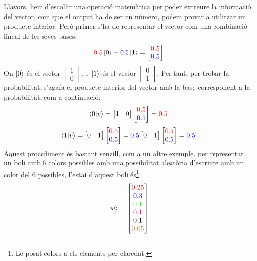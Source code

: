 Llavors, hem d'escollir una operació matemàtica per poder extreure la informació del vector, com que el output ha de ser un número, podem provar a utilitzar un producte interior. Però primer s'ha de representar el vector com una combinació lineal de les seves bases:
$$
\textcolor{red}{0.5}\ket{0} + \textcolor{blue}{0.5}\ket{1} = \begin{bmatrix}
	\textcolor{red}{0.5} \\
	\textcolor{blue}{0.5}
\end{bmatrix}
$$
On $\ket{0}$ és el vector $\begin{bmatrix} 1 \\ 0\end{bmatrix}$, i, $\ket{1}$ és el vector $\begin{bmatrix} 0 \\ 1 \end{bmatrix}$.
Per tant, per trobar la probabilitat, s'agafa el producte interior del vector amb la base corresponent a la probabilitat, com a continuació:
$$
\bra{0}\ket{v} =
\begin{bmatrix}
	1 &
	0
\end{bmatrix}
\begin{bmatrix}
	\textcolor{red}{0.5} \\
	\textcolor{blue}{0.5}
\end{bmatrix}
= \textcolor{red}{0.5}
$$
$$
\bra{1}\ket{v} =
\begin{bmatrix}
	0 &
	1
\end{bmatrix}
\begin{bmatrix}
	\textcolor{red}{0.5} \\
	\textcolor{blue}{0.5}
\end{bmatrix}
= \textcolor{blue}{0.5}
	\begin{bmatrix}
		0 &
		1
	\end{bmatrix}
	\begin{bmatrix}
		\textcolor{red}{0.5} \\
		\textcolor{blue}{0.5}
	\end{bmatrix}
	= \textcolor{blue}{0.5}
$$
Aquest procediment és bastant senzill, com a un altre exemple, per representar un boli amb 6 colors possibles amb una possibilitat aleatòria d'escriure amb un color del 6 possibles, l'estat d'aquest boli és\footnote{Le posat colors a els elements per claredat.}:
$$
\ket{w} =
\begin{bmatrix}
	\textcolor{red}{0.25} \\
	\textcolor{blue}{0.3 }\\
	\textcolor{green}{0.1 }\\
	\textcolor{magenta}{0.1 }\\
	\textcolor{black}{0.1 }\\
	\textcolor{brown}{0.05}
\end{bmatrix}
$$
